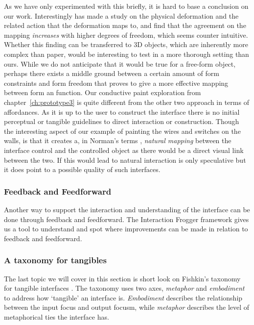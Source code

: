As we have only experimented with this briefly, it is hard to base a conclusion on our work.
Interestingly \citet{lee2010users} has made a study on the physical deformation and the related action that the deformation maps to, and find that the agreement on the mapping \emph{increases} with higher degrees of freedom, which seems counter intuitive.
Whether this finding can be transferred to 3D objects, which are inherently more complex than paper, would be interesting to test in a more thorough setting than ours.
While we do not anticipate that it would be true for a free-form object, perhaps there exists a middle ground between a certain amount of form constraints and form freedom that proves to give a more effective mapping between form an function.
\blank
Our conductive paint exploration from chapter~\ref{ch:prototype3} is quite different from the other two approach in terms of affordances.
As it is up to the user to construct the interface there is no initial perceptual or tangible guidelines to direct interaction or construction. Though the interesting aspect of our example of painting the wires and switches on the walls, is that it creates a, in Norman's terms \citep{norman2002design}, \emph{natural mapping} between the interface control and the controlled object as there would be a direct visual link between the two.
If this would lead to natural interaction is only speculative but it does point to a possible quality of such interfaces. 

\subsubsection{Feedback and Feedforward}
Another way to support the interaction and understanding of the interface can be done through feedback and feedforward.
The Interaction Frogger framework \citep{stienstra2012design,wensveen2004interaction} gives us a tool to understand and spot where improvements can be made in relation to feedback and feedforward.


\subsubsection{A taxonomy for tangibles}
The last topic we will cover in this section is short look on Fishkin's taxonomy for tangible interfaces \citep{fishkin2004taxonomy}.
The taxonomy uses two axes, \emph{metaphor} and \emph{embodiment} to address how `tangible' an interface is.
\emph{Embodiment} describes the relationship between the input focus and output focusm, while \emph{metaphor} describes the level of metaphorical ties the interface has. 

